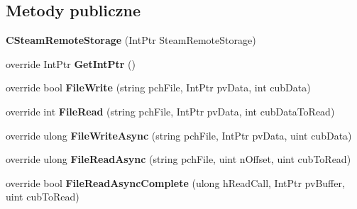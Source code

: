 \subsection*{Metody publiczne}
\begin{DoxyCompactItemize}
\item 
\mbox{\label{class_valve_1_1_steamworks_1_1_c_steam_remote_storage_a1bdc31f5d3458f710456bd99de9354f4}} 
{\bfseries C\+Steam\+Remote\+Storage} (Int\+Ptr Steam\+Remote\+Storage)
\item 
\mbox{\label{class_valve_1_1_steamworks_1_1_c_steam_remote_storage_aca3d3b2c6d98c0e1c25661fed0926092}} 
override Int\+Ptr {\bfseries Get\+Int\+Ptr} ()
\item 
\mbox{\label{class_valve_1_1_steamworks_1_1_c_steam_remote_storage_a35adc025fcb23c28b02946aa4c7c23f2}} 
override bool {\bfseries File\+Write} (string pch\+File, Int\+Ptr pv\+Data, int cub\+Data)
\item 
\mbox{\label{class_valve_1_1_steamworks_1_1_c_steam_remote_storage_a652e2419f03686be8c91116615ec960d}} 
override int {\bfseries File\+Read} (string pch\+File, Int\+Ptr pv\+Data, int cub\+Data\+To\+Read)
\item 
\mbox{\label{class_valve_1_1_steamworks_1_1_c_steam_remote_storage_af77731b2930b5b084cff2123bfcf9091}} 
override ulong {\bfseries File\+Write\+Async} (string pch\+File, Int\+Ptr pv\+Data, uint cub\+Data)
\item 
\mbox{\label{class_valve_1_1_steamworks_1_1_c_steam_remote_storage_ac4ce4737988b9018a2d130128fba8fd3}} 
override ulong {\bfseries File\+Read\+Async} (string pch\+File, uint n\+Offset, uint cub\+To\+Read)
\item 
\mbox{\label{class_valve_1_1_steamworks_1_1_c_steam_remote_storage_a059a1662ae23b5dd0f2553ee4d75b575}} 
override bool {\bfseries File\+Read\+Async\+Complete} (ulong h\+Read\+Call, Int\+Ptr pv\+Buffer, uint cub\+To\+Read)

\end{DoxyCompactItemize}
